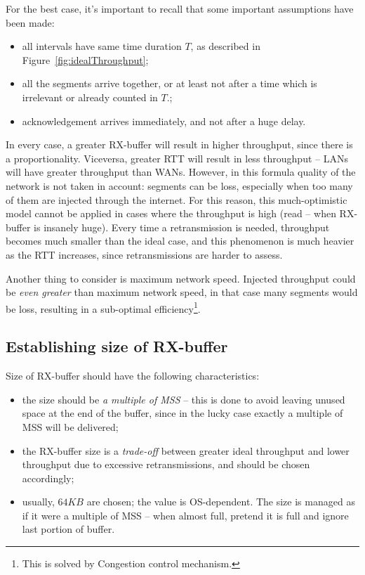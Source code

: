 \documentclass[10pt]{book}
\begin{document}
For the best case, it's important to recall that some important assumptions
have been made:
\begin{itemize}
    \item all intervals have same time duration $T$, as described in
        Figure~\ref{fig:idealThroughput};
    \item all the segments arrive together, or at least not after a time which
        is irrelevant or already counted in $T$.;
    \item acknowledgement arrives immediately, and not after a huge delay.
\end{itemize}

In every case, a greater RX-buffer will result in higher throughput, since
there is a proportionality. Viceversa, greater RTT will result in less
throughput \--- LANs will have greater throughput than WANs. However, in this
formula quality of the network is not taken in account: segments can be loss,
especially when too many of them are injected through the internet. For this
reason, this much-optimistic model cannot be applied in cases where the
throughput is high (read \--- when RX-buffer is insanely huge). Every time a
retransmission is needed, throughput becomes much smaller than the ideal case,
and this phenomenon is much heavier as the RTT increases, since retransmissions
are harder to assess.

Another thing to consider is maximum network speed. Injected throughput could
be \emph{even greater} than maximum network speed, in that case many segments
would be loss, resulting in a sub-optimal efficiency\footnote{This is solved by
Congestion control mechanism.}.

\subsection{Establishing size of RX-buffer}

Size of RX-buffer should have the following characteristics:
\begin{itemize}
    \item the size should be \emph{a multiple of MSS} \--- this is done to
        avoid leaving unused space at the end of the buffer, since in the lucky
        case exactly a multiple of MSS will be delivered;
    \item the RX-buffer size is a \emph{trade-off} between greater ideal
        throughput and lower throughput due to excessive retransmissions, and
        should be chosen accordingly;
    \item usually, $64KB$ are chosen; the value is OS-dependent. The size is
        managed as if it were a multiple of MSS \--- when almost full, pretend
        it is full and ignore last portion of buffer.
\end{itemize}
\end{document}
